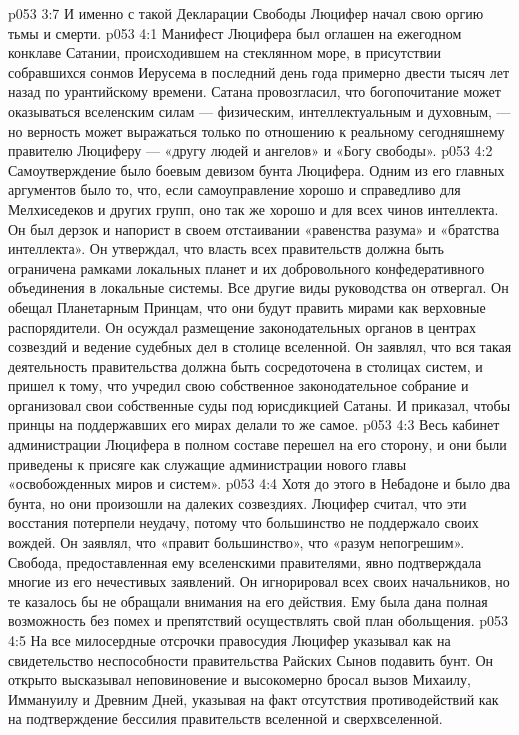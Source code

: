 \vs p053 3:7 \pc И именно с такой Декларации Свободы Люцифер начал свою оргию тьмы и смерти.
\vs p053 4:1 Манифест Люцифера был оглашен на ежегодном конклаве Сатании, происходившем на стеклянном море, в присутствии собравшихся сонмов Иерусема в последний день года примерно двести тысяч лет назад по урантийскому времени. Сатана провозгласил, что богопочитание может оказываться вселенским силам --- физическим, интеллектуальным и духовным, --- но верность может выражаться только по отношению к реальному сегодняшнему правителю Люциферу --- «другу людей и ангелов» и «Богу свободы».
\vs p053 4:2 Самоутверждение было боевым девизом бунта Люцифера. Одним из его главных аргументов было то, что, если самоуправление хорошо и справедливо для Мелхиседеков и других групп, оно так же хорошо и для всех чинов интеллекта. Он был дерзок и напорист в своем отстаивании «равенства разума» и «братства интеллекта». Он утверждал, что власть всех правительств должна быть ограничена рамками локальных планет и их добровольного конфедеративного объединения в локальные системы. Все другие виды руководства он отвергал. Он обещал Планетарным Принцам, что они будут править мирами как верховные распорядители. Он осуждал размещение законодательных органов в центрах созвездий и ведение судебных дел в столице вселенной. Он заявлял, что вся такая деятельность правительства должна быть сосредоточена в столицах систем, и пришел к тому, что учредил свою собственное законодательное собрание и организовал свои собственные суды под юрисдикцией Сатаны. И приказал, чтобы принцы на поддержавших его мирах делали то же самое.
\vs p053 4:3 Весь кабинет администрации Люцифера в полном составе перешел на его сторону, и они были приведены к присяге как служащие администрации нового главы «освобожденных миров и систем».
\vs p053 4:4 \pc Хотя до этого в Небадоне и было два бунта, но они произошли на далеких созвездиях. Люцифер считал, что эти восстания потерпели неудачу, потому что большинство не поддержало своих вождей. Он заявлял, что «правит большинство», что «разум непогрешим». Свобода, предоставленная ему вселенскими правителями, явно подтверждала многие из его нечестивых заявлений. Он игнорировал всех своих начальников, но те казалось бы не обращали внимания на его действия. Ему была дана полная возможность без помех и препятствий осуществлять свой план обольщения.
\vs p053 4:5 \pc На все милосердные отсрочки правосудия Люцифер указывал как на свидетельство неспособности правительства Райских Сынов подавить бунт. Он открыто высказывал неповиновение и высокомерно бросал вызов Михаилу, Иммануилу и Древним Дней, указывая на факт отсутствия противодействий как на подтверждение бессилия правительств вселенной и сверхвселенной.
